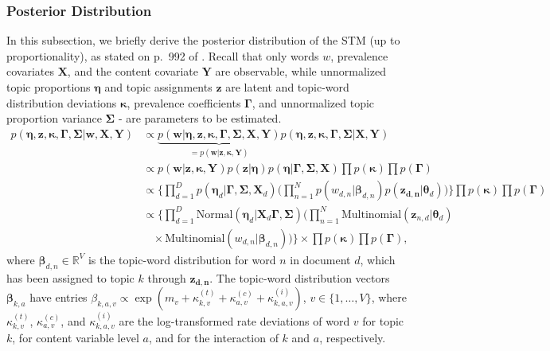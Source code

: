 \documentclass[12pt]{article}
\begin{document}
\subsubsection*{Posterior Distribution}

In this subsection, we briefly derive the posterior distribution of the STM (up to proportionality), as stated on p.\ 992 of \cite{roberts2016model}. Recall that only words $w$, prevalence covariates $\boldsymbol{X}$, and the content covariate $\boldsymbol{Y}$ are observable, while unnormalized topic proportions $\boldsymbol{\eta}$ and topic assignments $\boldsymbol{z}$ are latent and topic-word distribution deviations $\boldsymbol{\kappa}$, prevalence coefficients $\boldsymbol{\Gamma}$, and unnormalized topic proportion variance $\boldsymbol{\Sigma}$ - are parameters to be estimated.
\begin{align*}
p(\boldsymbol{\eta}, \boldsymbol{z}, \boldsymbol{\kappa}, \boldsymbol{\Gamma}, \boldsymbol{\Sigma} | \boldsymbol{w}, \boldsymbol{X}, \boldsymbol{Y}) & \propto \underbrace{p(\boldsymbol{w} | \boldsymbol{\eta}, \boldsymbol{z}, \boldsymbol{\kappa}, \boldsymbol{\Gamma}, \boldsymbol{\Sigma}, \boldsymbol{X}, \boldsymbol{Y})}_{=p(\boldsymbol{w} | \boldsymbol{z}, \boldsymbol{\kappa}, \boldsymbol{Y})} p(\boldsymbol{\eta}, \boldsymbol{z}, \boldsymbol{\kappa}, \boldsymbol{\Gamma}, \boldsymbol{\Sigma} | \boldsymbol{X}, \boldsymbol{Y}) \\
& \propto p(\boldsymbol{w} | \boldsymbol{z}, \boldsymbol{\kappa}, \boldsymbol{Y}) p(\boldsymbol{z} | \boldsymbol{\eta}) p(\boldsymbol{\eta} | \boldsymbol{\Gamma}, \boldsymbol{\Sigma}, \boldsymbol{X}) \prod p(\boldsymbol{\kappa}) \prod p(\boldsymbol{\Gamma}) \\
& \propto \Big\{ \prod_{d=1}^{D} p(\boldsymbol{\eta}_d | \boldsymbol{\Gamma}, \boldsymbol{\Sigma}, \boldsymbol{X}_d) \Big( \prod_{n=1}^{N} p(w_{d,n} | \boldsymbol{\beta}_{d, n}) p(\boldsymbol{z_{d,n}} | \boldsymbol{\theta}_d) \Big) \Big\} \prod p(\boldsymbol{\kappa}) \prod p(\boldsymbol{\Gamma}) \\
& \propto \Big\{ \prod_{d=1}^{D} \text{Normal}(\boldsymbol{\eta}_d | \boldsymbol{X}_d \boldsymbol{\Gamma}, \boldsymbol{\Sigma}) \Big( \prod_{n=1}^{N} \text{Multinomial}(\boldsymbol{z}_{n,d}| \boldsymbol{\theta}_d) \\
& \ \ \ \ \times \text{Multinomial}(w_{d,n} | \boldsymbol{\beta}_{d,n}) \Big) \Big\} \times \prod p(\boldsymbol{\kappa}) \prod p(\boldsymbol{\Gamma}),
\end{align*}
where $\boldsymbol{\beta}_{d, n} \in \mathbb{R}^V$ is the topic-word distribution for word $n$ in document $d$, which has been assigned to topic $k$ through $\boldsymbol{z_{d,n}}$. The topic-word distribution vectors $\boldsymbol{\beta}_{k,a}$ have entries $\beta_{k,a,v} \propto \exp(m_{v} + \kappa_{k,v}^{(t)} + \kappa_{a,v}^{(c)} + \kappa_{k, a,v}^{(i)})$, $v \in \{1,\dots,V\}$, where $\kappa_{k,v}^{(t)}$, $\kappa_{a,v}^{(c)}$, and $\kappa_{k, a,v}^{(i)}$ are the log-transformed rate deviations of word $v$ for topic $k$, for content variable level $a$, and for the interaction of $k$ and $a$, respectively.
\end{document}
